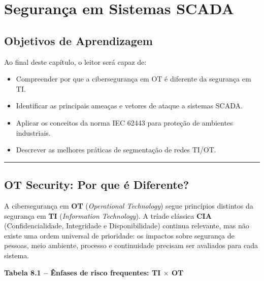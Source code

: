 \chapter{Segurança em Sistemas SCADA}\label{seguranuxe7a-em-sistemas-scada}

\section*{Objetivos de Aprendizagem}

Ao final deste capítulo, o leitor será capaz de:

\begin{itemize}
\tightlist
\item
  Compreender por que a cibersegurança em OT é diferente da segurança em TI.
\item
  Identificar as principais ameaças e vetores de ataque a sistemas SCADA.
\item
  Aplicar os conceitos da norma IEC 62443 para proteção de ambientes industriais.
\item
  Descrever as melhores práticas de segmentação de redes TI/OT.
\end{itemize}

\begin{center}\rule{0.5\linewidth}{0.5pt}\end{center}

\section{OT Security: Por que é Diferente?}\label{ot-security-por-que-uxe9-diferente}

A cibersegurança em \textbf{OT} (\emph{Operational Technology}) segue princípios distintos da segurança em \textbf{TI} (\emph{Information Technology}). A tríade clássica \textbf{CIA} (Confidencialidade, Integridade e Disponibilidade) continua relevante, mas não existe uma ordem universal de prioridade: os impactos sobre segurança de pessoas, meio ambiente, processo e continuidade precisam ser avaliados para cada sistema.

\textbf{Tabela 8.1 -- Ênfases de risco frequentes: TI \ensuremath{\times} OT}

